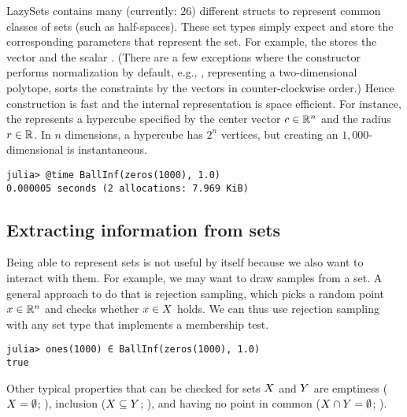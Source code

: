 \smallskip

LazySets contains many (currently: $26$) different structs to represent common classes of sets (such as half-spaces).
These set types simply expect and store the corresponding parameters that represent the set.
For example, the  stores the vector  and the scalar .
(There are a few exceptions where the constructor performs normalization by default, e.g., , representing a two-dimensional polytope, sorts the constraints by the vectors  in counter-clockwise order.)
Hence construction is fast and the internal representation is space efficient.
For instance, the  represents a hypercube specified by the center vector $c \in \mathbb{R}^n$ and the radius $r \in \mathbb{R}$.
In $n$ dimensions, a hypercube has $2^n$ vertices, but creating an $1{,}000$-dimensional  is instantaneous.

\begin{minipage}{\linewidth}
\vspace{-\abovedisplayskip}
\begin{lstlisting}
julia> @time BallInf(zeros(1000), 1.0)
0.000005 seconds (2 allocations: 7.969 KiB)
\end{lstlisting}
\end{minipage}


\subsection{Extracting information from sets}

Being able to represent sets is not useful by itself because we also want to interact with them.
For example, we may want to draw samples from a set.
A general approach to do that is rejection sampling, which picks a random point $x \in \mathbb{R}^n$ and checks whether $x \in X$ holds.
We can thus use rejection sampling with any set type that implements a membership test.

\begin{minipage}{\linewidth}
\vspace{-\abovedisplayskip}
\begin{lstlisting}
julia> ones(1000) ∈ BallInf(zeros(1000), 1.0)
true
\end{lstlisting}
\end{minipage}

Other typical properties that can be checked for sets $X$ and $Y$ are emptiness ($X = \emptyset$; ), inclusion ($X \subseteq Y$; ), and having no point in common ($X \cap Y = \emptyset$; ).

